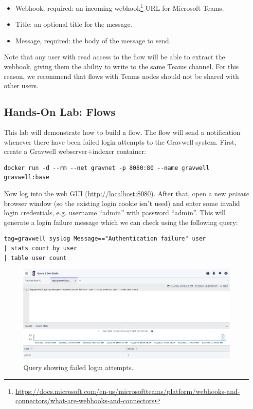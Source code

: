 \begin{itemize}
\item Webhook, required: an incoming webhook\footnote{\href{https://docs.microsoft.com/en-us/microsoftteams/platform/webhooks-and-connectors/what-are-webhooks-and-connectors}{https://docs.microsoft.com/en-us/microsoftteams/platform/webhooks-and-connectors/what-are-webhooks-and-connectors}} URL for Microsoft Teams.
\item Title: an optional title for the message.
\item Message, required: the body of the message to send.
\end{itemize}

Note that any user with read access to the flow will be able to extract the webhook, giving them the ability to write to the same Teams channel. For this reason, we recommend that flows with Teams nodes should not be shared with other users.

\clearpage
\subsection{Hands-On Lab: Flows}

This lab will demonstrate how to build a flow. The flow will send a notification whenever there have been failed login attempts to the Gravwell system. First, create a Gravwell webserver+indexer container:

\begin{Verbatim}[breaklines=true]
docker run -d --rm --net gravnet -p 8080:80 --name gravwell gravwell:base
\end{Verbatim}

Now log into the web GUI (\href{http://localhost:8080}{http://localhost:8080}). After that, open a new \emph{private} browser window (so the existing login cookie isn't used) and enter some invalid login credentials, e.g. username ``admin'' with password ``admin''. This will generate a login failure message which we can check using the following query:

\begin{Verbatim}[breaklines=true]
tag=gravwell syslog Message=="Authentication failure" user 
| stats count by user 
| table user count
\end{Verbatim}

\begin{figure}
	\includegraphics[width=0.85\linewidth]{images/lab-failed-logins.png}
	\caption{Query showing failed login attempts.}
	\label{fig:lab-failed-logins}
\end{figure}

